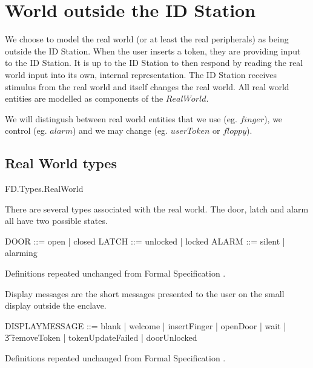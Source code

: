 \section{World outside the ID Station}
We choose to model the real world (or at least the real peripherals)
as being outside the ID Station.
When the user inserts a token, they are providing input to the ID Station.
It is up to the ID Station to then respond by reading the real world
input into its own, internal representation. The ID Station receives stimulus
from the real world and itself changes the real world. All real world
entities are modelled as components of the $RealWorld$.

We will distingush between real world entities that we use
 (eg. $finger$), we control (eg. $alarm$) 
 and we may change (eg. $userToken$ or $floppy$).


\subsection{Real World types}

\begin{traceunit}{FD.Types.RealWorld}
\end{traceunit}


There are several types associated with the real world. The door,
latch and alarm all have two possible states.
\begin{zed}
	DOOR ::= open | closed
\also
	LATCH ::= unlocked | locked
\also
	ALARM ::= silent | alarming
\end{zed}
\begin{Zcomment}
\item Definitions repeated unchanged from Formal Specification \cite{FS}.
\end{Zcomment}


Display messages are the short messages presented to the user on the
small display outside the enclave.
\begin{zed}
	DISPLAYMESSAGE ::= blank | welcome | insertFinger | openDoor |
                        wait | 
\\      \t3  removeToken | tokenUpdateFailed | doorUnlocked
\end{zed}
\begin{Zcomment}
\item Definitions repeated unchanged from Formal Specification \cite{FS}.
\end{Zcomment}


